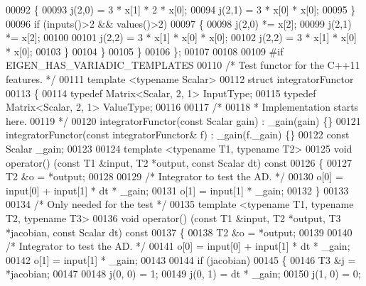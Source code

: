 \begin{DoxyCode}
00092       \{
00093         j(2,0) = 3 * x[1] * 2 * x[0];
00094         j(2,1) = 3 * x[0] * x[0];
00095       \}
00096       \textcolor{keywordflow}{if} (inputs()>2 && values()>2)
00097       \{
00098         j(2,0) *= x[2];
00099         j(2,1) *= x[2];
00100 
00101         j(2,2) = 3 * x[1] * x[0] * x[0];
00102         j(2,2) = 3 * x[1] * x[0] * x[0];
00103       \}
00104     \}
00105   \}
00106 \};
00107 
00108 
00109 \textcolor{preprocessor}{#if EIGEN\_HAS\_VARIADIC\_TEMPLATES}
00110 \textcolor{comment}{/* Test functor for the C++11 features. */}
00111 \textcolor{keyword}{template} <\textcolor{keyword}{typename} Scalar>
00112 \textcolor{keyword}{struct }integratorFunctor
00113 \{
00114     \textcolor{keyword}{typedef} Matrix<Scalar, 2, 1> InputType;
00115     \textcolor{keyword}{typedef} Matrix<Scalar, 2, 1> ValueType;
00116 
00117     \textcolor{comment}{/*}
00118 \textcolor{comment}{     * Implementation starts here.}
00119 \textcolor{comment}{     */}
00120     integratorFunctor(\textcolor{keyword}{const} Scalar gain) : \_gain(gain) \{\}
00121     integratorFunctor(\textcolor{keyword}{const} integratorFunctor& f) : \_gain(f.\_gain) \{\}
00122     \textcolor{keyword}{const} Scalar \_gain;
00123 
00124     \textcolor{keyword}{template} <\textcolor{keyword}{typename} T1, \textcolor{keyword}{typename} T2>
00125     \textcolor{keywordtype}{void} operator() (\textcolor{keyword}{const} T1 &input, T2 *output, \textcolor{keyword}{const} Scalar dt)\textcolor{keyword}{ const}
00126 \textcolor{keyword}{    }\{
00127         T2 &o = *output;
00128 
00129         \textcolor{comment}{/* Integrator to test the AD. */}
00130         o[0] = input[0] + input[1] * dt * \_gain;
00131         o[1] = input[1] * \_gain;
00132     \}
00133 
00134     \textcolor{comment}{/* Only needed for the test */}
00135     \textcolor{keyword}{template} <\textcolor{keyword}{typename} T1, \textcolor{keyword}{typename} T2, \textcolor{keyword}{typename} T3>
00136     \textcolor{keywordtype}{void} operator() (\textcolor{keyword}{const} T1 &input, T2 *output, T3 *jacobian, \textcolor{keyword}{const} Scalar dt)\textcolor{keyword}{ const}
00137 \textcolor{keyword}{    }\{
00138         T2 &o = *output;
00139 
00140         \textcolor{comment}{/* Integrator to test the AD. */}
00141         o[0] = input[0] + input[1] * dt * \_gain;
00142         o[1] = input[1] * \_gain;
00143 
00144         \textcolor{keywordflow}{if} (jacobian)
00145         \{
00146             T3 &j = *jacobian;
00147 
00148             j(0, 0) = 1;
00149             j(0, 1) = dt * \_gain;
00150             j(1, 0) = 0;

\end{DoxyCode}
